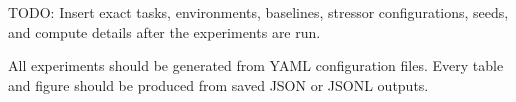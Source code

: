 TODO: Insert exact tasks, environments, baselines, stressor configurations, seeds, and compute details after the experiments are run.

All experiments should be generated from YAML configuration files. Every table and figure should be produced from saved JSON or JSONL outputs.
